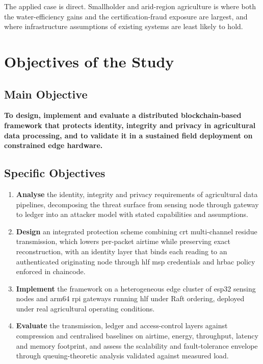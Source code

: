 \documentclass[12pt,a4paper,oneside]{book}
\begin{document}
The applied case is direct. Smallholder and arid-region agriculture is where
both the water-efficiency gains and the certification-fraud exposure are
largest, and where infrastructure assumptions of existing systems are least
likely to hold.

\section{Objectives of the Study}
\label{sec:objectives}

\subsection{Main Objective}
\label{subsec:main_objective}

\textbf{To design, implement and evaluate a distributed blockchain-based
framework that protects identity, integrity and privacy in agricultural data
processing, and to validate it in a sustained field deployment on constrained
edge hardware.}

\subsection{Specific Objectives}
\label{subsec:specific_objectives}

\begin{enumerate}
  \item \textbf{Analyse} the identity, integrity and privacy requirements of
        agricultural data pipelines, decomposing the threat surface from
        sensing node through gateway to ledger into an attacker model with
        stated capabilities and assumptions.

  \item \textbf{Design} an integrated protection scheme combining \gls{crt}
        multi-channel residue transmission, which lowers per-packet airtime
        while preserving exact reconstruction, with an identity layer that
        binds each reading to an authenticated originating node through
        \gls{hlf} \gls{msp} credentials and \gls{hrbac} policy enforced in
        chaincode.

  \item \textbf{Implement} the framework on a heterogeneous edge cluster of
        \gls{esp32} sensing nodes and \gls{arm64} \gls{rpi} gateways running
        \gls{hlf} under Raft ordering, deployed under real agricultural
        operating conditions.

  \item \textbf{Evaluate} the transmission, ledger and access-control layers
        against compression and centralised baselines on airtime, energy,
        throughput, latency and memory footprint, and assess the scalability
        and fault-tolerance envelope through queuing-theoretic analysis
        validated against measured load.
\end{enumerate}
\end{document}
